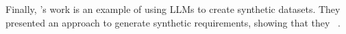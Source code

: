Finally, \citeauthor{DBLP:journals/corr/abs-2506-21138}'s work is an example of using LLMs to create synthetic datasets.
They presented an approach to generate synthetic requirements, showing that they ~\cite{DBLP:journals/corr/abs-2506-21138}.
